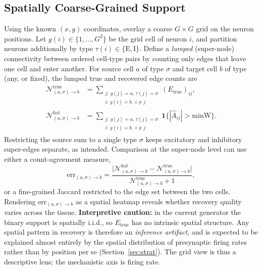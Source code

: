 \documentclass[11pt]{article}
\newcommand{\Ahat}{\hat{A}}
\newcommand{\Etrue}{E_{\mathrm{true}}}
\newcommand{\minW}{\mathrm{minW}}
\begin{document}
\subsection{Spatially Coarse-Grained Support}
\label{sec:grid}
Using the known $(x,y)$ coordinates, overlay a coarse $G\times G$ grid on the
neuron positions. Let $g(i)\in\{1,\dots,G^2\}$ be the grid cell of neuron $i$,
and partition neurons additionally by type $\tau(i)\in\{\mathrm{E,I}\}$. Define
a \emph{lumped} (super-node) connectivity between ordered cell-type pairs by
counting only edges that leave one cell and enter another. For source cell $a$
of type $\sigma$ and target cell $b$ of type (any, or fixed), the lumped true
and recovered edge counts are
\begin{align}
  \mathcal{N}^{\mathrm{true}}_{(a,\sigma)\to b}
  &= \sum_{\substack{j:\,g(j)=a,\,\tau(j)=\sigma \\ i:\,g(i)=b,\; i\neq j}}
     (\Etrue)_{ij}, \\
  \mathcal{N}^{\mathrm{hat}}_{(a,\sigma)\to b}
  &= \sum_{\substack{j:\,g(j)=a,\,\tau(j)=\sigma \\ i:\,g(i)=b,\; i\neq j}}
     \mathbf{1}\{|\Ahat_{ij}|>\minW\}.
\end{align}
Restricting the source sum to a single type $\sigma$ keeps excitatory and
inhibitory super-edges separate, as intended. Comparison at the super-node
level can use either a count-agreement measure,
\begin{equation}
  \mathrm{err}_{(a,\sigma)\to b}
  = \frac{\bigl|\mathcal{N}^{\mathrm{hat}}_{(a,\sigma)\to b}
                - \mathcal{N}^{\mathrm{true}}_{(a,\sigma)\to b}\bigr|}
         {\mathcal{N}^{\mathrm{true}}_{(a,\sigma)\to b}+1},
\end{equation}
or a fine-grained Jaccard restricted to the edge set between the two cells.
Rendering $\mathrm{err}_{(a,\sigma)\to b}$ as a spatial heatmap reveals whether
recovery quality varies across the tissue. \textbf{Interpretive caution:} in
the current generator the binary support is spatially i.i.d., so $\Etrue$ has no
intrinsic spatial structure. Any spatial pattern in recovery is therefore an
\emph{inference artifact}, and is expected to be explained almost entirely by
the spatial distribution of presynaptic firing rates rather than by position
per se (Section~\ref{sec:strat}). The grid view is thus a descriptive lens; the
mechanistic axis is firing rate.
\end{document}
